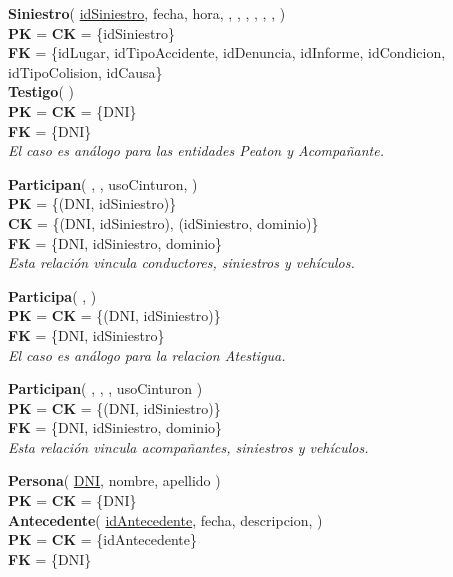\textbf{Siniestro}(
    \uline{idSiniestro},
    fecha,
    hora,
    ,
    ,
    ,
    ,
    ,
    ,
)\\
\textbf{PK} = \textbf{CK} = \{idSiniestro\}\\
\textbf{FK} = \{idLugar, idTipoAccidente, idDenuncia, idInforme, idCondicion, idTipoColision, idCausa\}\\

\textbf{Testigo}(
)\\
\textbf{PK} = \textbf{CK} = \{DNI\}\\
\textbf{FK} = \{DNI\}\\
\textit{El caso es análogo para las entidades Peaton y Acompañante.}

\textbf{Participan}(
    ,
    ,
    usoCinturon,
)\\
\textbf{PK} = \{(DNI, idSiniestro)\}\\
\textbf{CK} = \{(DNI, idSiniestro), (idSiniestro, dominio)\}\\
\textbf{FK} = \{DNI, idSiniestro, dominio\}\\
\textit{Esta relación vincula conductores, siniestros y vehículos.}

\textbf{Participa}(
    ,
)\\
\textbf{PK} = \textbf{CK} = \{(DNI, idSiniestro)\}\\
\textbf{FK} = \{DNI, idSiniestro\}\\
\textit{El caso es análogo para la relacion Atestigua.}

\textbf{Participan}(
    ,
    ,
    ,
    usoCinturon
)\\
\textbf{PK} = \textbf{CK} = \{(DNI, idSiniestro)\}\\
\textbf{FK} = \{DNI, idSiniestro, dominio\}\\
\textit{Esta relación vincula acompañantes, siniestros y vehículos.}

\textbf{Persona}(
    \uline{DNI},
    nombre,
    apellido
)\\
\textbf{PK} = \textbf{CK} = \{DNI\}\\

\textbf{Antecedente}(
    \uline{idAntecedente},
    fecha,
    descripcion,
)\\
\textbf{PK} = \textbf{CK} = \{idAntecedente\}\\
\textbf{FK} = \{DNI\}\\

